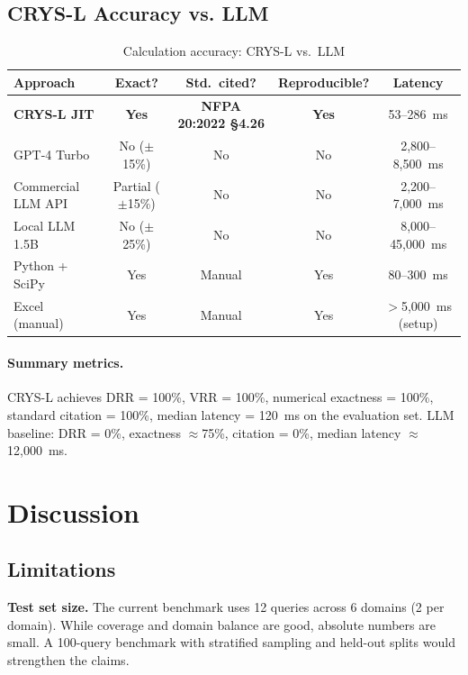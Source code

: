 \documentclass[12pt,a4paper]{article}
\begin{document}
\subsection{CRYS-L Accuracy vs. LLM}

\begin{table}[h]
\centering
\caption{Calculation accuracy: CRYS-L vs.\ LLM}
\label{tab:accuracy}
\begin{tabular}{lcccc}
\toprule
Approach & Exact? & Std.\ cited? & Reproducible? & Latency \\
\midrule
\textbf{CRYS-L JIT} & \textbf{Yes} & \textbf{NFPA 20:2022 \S4.26} & \textbf{Yes} & 53--286~ms \\
GPT-4 Turbo & No ($\pm$15\%) & No & No & 2,800--8,500~ms \\
Commercial LLM API & Partial ($\pm$15\%) & No & No & 2,200--7,000~ms \\
Local LLM 1.5B & No ($\pm$25\%) & No & No & 8,000--45,000~ms \\
Python + SciPy & Yes & Manual & Yes & 80--300~ms \\
Excel (manual) & Yes & Manual & Yes & $>$5,000~ms (setup) \\
\bottomrule
\end{tabular}
\end{table}

\paragraph{Summary metrics.}
CRYS-L achieves DRR = 100\%, VRR = 100\%, numerical exactness = 100\%,
standard citation = 100\%, median latency = 120~ms on the evaluation set.
LLM baseline: DRR = 0\%, exactness $\approx$75\%, citation = 0\%,
median latency $\approx$12,000~ms.

\section{Discussion}

\subsection{Limitations}

\textbf{Test set size.} The current benchmark uses 12 queries across 6 domains
(2 per domain). While coverage and domain balance are good, absolute numbers
are small. A 100-query benchmark with stratified sampling and held-out splits
would strengthen the claims.
\end{document}
